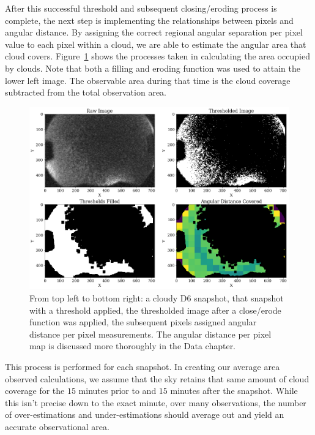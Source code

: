 After this successful threshold and subsequent closing/eroding process is complete, the next step is implementing the relationships between pixels and angular distance.
By assigning the correct regional angular separation per pixel value to each pixel within a cloud, we are able to estimate the angular area that cloud covers.
Figure~\ref{colorclouds} shows the processes taken in calculating the area occupied by clouds.
Note that both a filling and eroding function was used to attain the lower left image.
The observable area during that time is the cloud coverage subtracted from the total observation area.


\begin{figure}[ht!]
  \centering
  \includegraphics[scale=0.4]{images/Cloud_analysis.png}
  \caption{From top left to bottom right: a cloudy D6 snapshot, that snapshot with a threshold applied, the thresholded image after a close/erode function was applied, the subsequent pixels assigned angular distance per pixel measurements.  The angular distance per pixel map is discussed more thoroughly in the Data chapter.}
  \label{colorclouds}
\end{figure}

This process is performed for each snapshot.
In creating our average area observed calculations, we assume that the sky retains that same amount of cloud coverage for the $15$ minutes prior to and $15$ minutes after the snapshot.
While this isn't precise down to the exact minute, over many observations, the number of over-estimations and under-estimations should average out and yield an accurate observational area.























 
